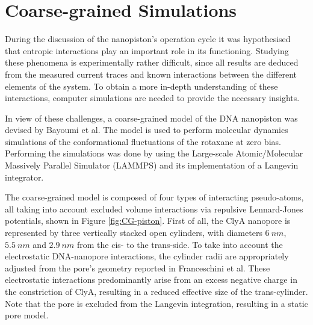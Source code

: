 \section{Coarse-grained Simulations}

During the discussion of the nanopiston's operation cycle it was hypothesised
that entropic interactions play an important role in its functioning. Studying these
phenomena is experimentally rather difficult, since all results are deduced from the
measured current traces and known interactions between the different elements of the
system. To obtain a more in-depth understanding of these interactions, computer
simulations are needed to provide the necessary insights.

In view of these challenges, a coarse-grained model of the DNA nanopiston was devised by
Bayoumi et al. The model is used to perform molecular dynamics simulations of  the
conformational fluctuations of the rotaxane at zero bias. Performing the simulations was
done by using the Large-scale Atomic/Molecular Massively Parallel Simulator (LAMMPS) and
its implementation of a Langevin integrator. \cite{PLIMPTON19951}

The coarse-grained model is composed of four types of interacting pseudo-atoms, all
taking into account excluded volume interactions via repulsive Lennard-Jones
potentials, shown in Figure \ref{fig:CG-piston}. First of all, the ClyA nanopore is
represented by three vertically stacked
open cylinders, with diameters $6\ nm$, $5.5\ nm$ and $2.9\ nm$ from the cis- to the
trans-side.
To take into account the electrostatic DNA-nanopore interactions, the cylinder radii
are appropriately adjusted from the pore's geometry reported in Franceschini et
al.\cite{Franceschini2016}
These electrostatic interactions predominantly arise from an excess negative charge in
the constriction of ClyA, resulting in a reduced effective size of the trans-cylinder.
Note that the pore is excluded from the Langevin integration, resulting in a static pore
model.

